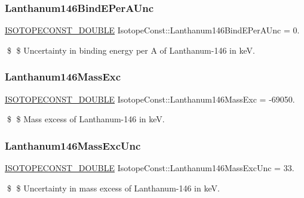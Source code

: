 \subsubsection{\texorpdfstring{Lanthanum146\+Bind\+E\+Per\+A\+Unc}{Lanthanum146BindEPerAUnc}}
{\footnotesize\ttfamily \mbox{\hyperlink{group___isotope_const-_macros_ga8f45a7272ce02c0b4c65c44636ed719a}{I\+S\+O\+T\+O\+P\+E\+C\+O\+N\+S\+T\+\_\+\+D\+O\+U\+B\+LE}} Isotope\+Const\+::\+Lanthanum146\+Bind\+E\+Per\+A\+Unc = 0.}

\$ \$ Uncertainty in binding energy per A of Lanthanum-\/146 in keV. \mbox{\label{group___isotope_const-_lanthanum-_la146_ga0ac3b99c830493ff8056e500d7437bbf}} 
\subsubsection{\texorpdfstring{Lanthanum146\+Mass\+Exc}{Lanthanum146MassExc}}
{\footnotesize\ttfamily \mbox{\hyperlink{group___isotope_const-_macros_ga8f45a7272ce02c0b4c65c44636ed719a}{I\+S\+O\+T\+O\+P\+E\+C\+O\+N\+S\+T\+\_\+\+D\+O\+U\+B\+LE}} Isotope\+Const\+::\+Lanthanum146\+Mass\+Exc = -\/69050.}

\$ \$ Mass excess of Lanthanum-\/146 in keV. \mbox{\label{group___isotope_const-_lanthanum-_la146_gab8ff41e7dacc81a67d330e3f76d6aeb7}} 
\subsubsection{\texorpdfstring{Lanthanum146\+Mass\+Exc\+Unc}{Lanthanum146MassExcUnc}}
{\footnotesize\ttfamily \mbox{\hyperlink{group___isotope_const-_macros_ga8f45a7272ce02c0b4c65c44636ed719a}{I\+S\+O\+T\+O\+P\+E\+C\+O\+N\+S\+T\+\_\+\+D\+O\+U\+B\+LE}} Isotope\+Const\+::\+Lanthanum146\+Mass\+Exc\+Unc = 33.}

\$ \$ Uncertainty in mass excess of Lanthanum-\/146 in keV. \mbox{\label{group___isotope_const-_lanthanum-_la146_gafd0228637cd799347ecb0216de8304d5}} 
